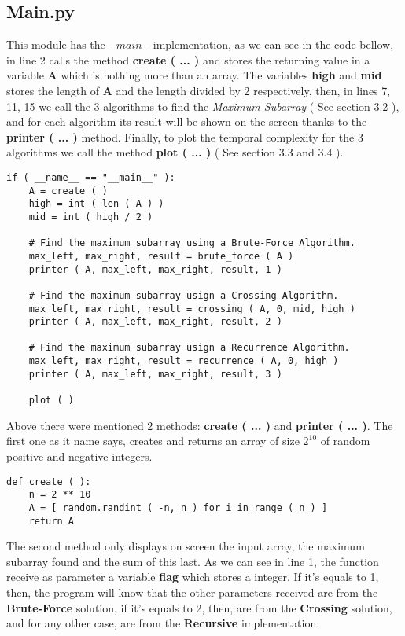 \subsection{Main.py}

This module has the $\_\_main\_\_$ implementation, as we can see in the code bellow, in line 2 calls the method {\bfseries create ( ... )} and stores the returning value in a variable {\bfseries A} which is nothing more than an array. The variables {\bfseries high} and {\bfseries mid} stores the length of {\bfseries A} and the length divided by 2 respectively, then, in lines 7, 11, 15 we call the 3 algorithms to find the {\itshape Maximum Subarray} ( See section 3.2 ), and for each algorithm its result will be shown on the screen thanks to the {	\bfseries printer ( ... )} method. Finally, to plot the temporal complexity for the 3 algorithms we call the method {\bfseries plot ( ... )} ( 	See section 3.3 and 3.4 ). \hfill \break

\begin{lstlisting}
if ( __name__ == "__main__" ):
    A = create ( )
    high = int ( len ( A ) )
    mid = int ( high / 2 )
    
    # Find the maximum subarray using a Brute-Force Algorithm.
    max_left, max_right, result = brute_force ( A )
    printer ( A, max_left, max_right, result, 1 )
    
    # Find the maximum subarray usign a Crossing Algorithm.
    max_left, max_right, result = crossing ( A, 0, mid, high )
    printer ( A, max_left, max_right, result, 2 )
    
    # Find the maximum subarray usign a Recurrence Algorithm.
    max_left, max_right, result = recurrence ( A, 0, high )
    printer ( A, max_left, max_right, result, 3 )
    
    plot ( )
\end{lstlisting} \hfill

Above there were mentioned 2 methods: {\bfseries create ( ... )} and {\bfseries printer ( ... )}. The first one as it name says, creates and returns an array of size $2^{10}$ of random positive and negative integers. \hfill \break

\begin{lstlisting}
def create ( ):
    n = 2 ** 10
    A = [ random.randint ( -n, n ) for i in range ( n ) ]
    return A
\end{lstlisting} \hfill

The second method only displays on screen the input array, the maximum subarray found and the sum of this last. As we can see in line 1, the function receive as parameter a variable {\bfseries flag} which stores a integer. If it's equals to 1, then, the program will know that the other parameters received are from the {\bfseries Brute-Force} solution, if it's equals to 2, then, are from the {\bfseries Crossing} solution, and for any other case, are from the {\bfseries Recursive} implementation. \hfill \break

